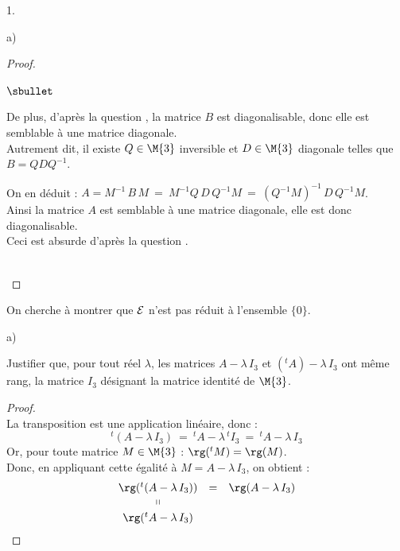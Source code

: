 \documentclass[11pt]{article}%
\begin{document}
\begin{noliste}{1.}
\begin{noliste}{a)}
\begin{proof}
\begin{noliste}{$\sbullet$}
	
	
	
	\item De plus, d'après la question , la 
	matrice $B$ est diagonalisable, donc elle est semblable à une 
	matrice diagonale.\\
	Autrement dit, il existe $Q \in \M{3}$ inversible et $D \in 
	\M{3}$ diagonale telles que $B=QDQ^{-1}$.
	
	\item On en déduit : $A = M^{-1} \, B \, M \ = \ M^{-1} Q \, D 
	\, Q^{-1} M \ = \ (Q^{-1} M)^{-1} \, D \, Q^{-1} M$.\\
	Ainsi la matrice $A$ est semblable à une matrice diagonale, elle
	est donc diagonalisable.\\
	Ceci est absurde d'après la question .
      \end{noliste}
      
      
      ~\\[-1.4cm]
    \end{proof}
  \end{noliste}
  
  \item On cherche à montrer que ${\cal E}$ n'est pas réduit à 
  l'ensemble $\{0\}$.
  \begin{noliste}{a)}
    \setlength{\itemsep}{2mm}
    \item Justifier que, pour tout réel $\lambda$, les matrices 
    $A-\lambda \, I_3$ et $({}^t A)- \lambda \, I_3$ ont même rang, 
    la matrice $I_3$ désignant la matrice identité de $\M{3}$.
    
    \begin{proof}~\\
      La transposition est une application linéaire, donc :
      \[
        {}^t(A- \lambda \, I_3) \ = \ {}^t A - \lambda \, {}^t I_3
        \ = \ {}^t A - \lambda \, I_3
      \]
      Or, pour toute matrice $M\in \M{3}$ : $\rg({}^t M) = \rg(M)$.\\
      Donc, en appliquant cette égalité à $M= A - \lambda \, I_3$, on 
      obtient :
      \[
       \begin{array}{ccc}
        \rg({}^t (A- \lambda \, I_3)) & = &  \rg(A- \lambda \, I_3)
        \\
        \shortparallel
        \\[.1cm]
        \rg({}^t A - \lambda \, I_3)
       \end{array}
      \]
      

\end{proof}
\end{noliste}
\end{noliste}
\end{document}
